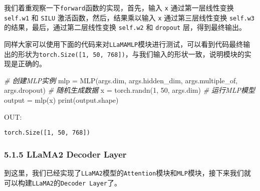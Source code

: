 \documentclass[
]{article}
\newenvironment{Shaded}{}{}
\newcommand{\BuiltInTok}[1]{\textcolor[rgb]{0.00,0.50,0.00}{#1}}
\newcommand{\CommentTok}[1]{\textcolor[rgb]{0.38,0.63,0.69}{\textit{#1}}}
\newcommand{\DecValTok}[1]{\textcolor[rgb]{0.25,0.63,0.44}{#1}}
\newcommand{\NormalTok}[1]{#1}
\newcommand{\OperatorTok}[1]{\textcolor[rgb]{0.40,0.40,0.40}{#1}}
\begin{document}
我们着重观察一下\texttt{forward}函数的实现，首先，输入 \texttt{x}
通过第一层线性变换 \texttt{self.w1} 和 \texttt{SILU}
激活函数，然后，结果乘以输入 \texttt{x} 通过第三层线性变换
\texttt{self.w3} 的结果，最后，通过第二层线性变换 \texttt{self.w2} 和
\texttt{dropout} 层，得到最终输出。

同样大家可以使用下面的代码来对\texttt{LLaMAMLP}模块进行测试，可以看到代码最终输出的形状为\texttt{torch.Size({[}1,\ 50,\ 768{]})}，与我们输入的形状一致，说明模块的实现是正确的。

\begin{Shaded}
\begin{Highlighting}[]
\CommentTok{\# 创建MLP实例}
\NormalTok{mlp }\OperatorTok{=}\NormalTok{ MLP(args.dim, args.hidden\_dim, args.multiple\_of, args.dropout)}
\CommentTok{\# 随机生成数据}
\NormalTok{x }\OperatorTok{=}\NormalTok{ torch.randn(}\DecValTok{1}\NormalTok{, }\DecValTok{50}\NormalTok{, args.dim)}
\CommentTok{\# 运行MLP模型}
\NormalTok{output }\OperatorTok{=}\NormalTok{ mlp(x)}
\BuiltInTok{print}\NormalTok{(output.shape)}
\end{Highlighting}
\end{Shaded}

OUT:

\begin{verbatim}
torch.Size([1, 50, 768])
\end{verbatim}

\subsubsection{5.1.5 LLaMA2 Decoder Layer}\label{llama2-decoder-layer}

到这里，我们已经实现了\texttt{LLaMA2}模型的\texttt{Attention}模块和\texttt{MLP}模块，接下来我们就可以构建\texttt{LLaMA2}的\texttt{Decoder\ Layer}了。
\end{document}
